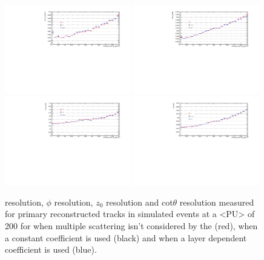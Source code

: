 \begin{figure}[htb]
\centering
\includegraphics[width=0.49\textwidth]{figs/tk-upgrade/results-lowPtTracking/qOverPtResVsInvPtTiltedGeometry_5000.pdf}
\includegraphics[width=0.49\textwidth]{figs/tk-upgrade/results-lowPtTracking/phi0ResVsInvPtTiltedGeometry_5000.pdf}
\\
\includegraphics[width=0.49\textwidth]{figs/tk-upgrade/results-lowPtTracking/z0ResVsInvPtTiltedGeometry_5000.pdf}
\includegraphics[width=0.49\textwidth]{figs/tk-upgrade/results-lowPtTracking/cotThetaResVsInvPtTiltedGeometry_5000.pdf}
\caption{\pt resolution, $\phi$ resolution, $z_{0}$ resolution and cot$\theta$ resolution measured for primary reconstructed tracks in simulated \ttbar events at a <PU> of 200 for when multiple scattering isn't considered by the \KF (red), when a constant \MS coefficient is used (black) and when a layer dependent coefficient is used (blue).
}
\label{fig:kfHelixParametersResVsInvPt}
\end{figure}

